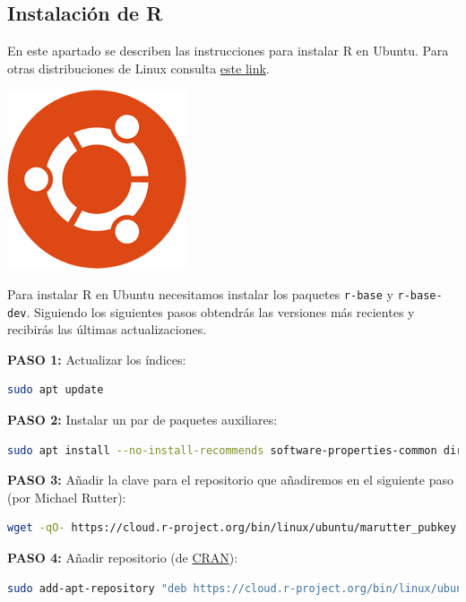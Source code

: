 \documentclass[
  title=normal,
  notoc,
  bib=normal]{mnye}
\newcommand{\passthrough}[1]{#1}
\begin{document}
\hypertarget{instalaciuxf3n-de-r}{%
\subsection{Instalación de R}\label{instalaciuxf3n-de-r}}

En este apartado se describen las instrucciones para instalar R en Ubuntu. Para otras distribuciones de Linux consulta \href{https://cloud.r-project.org/bin/linux/}{este link}.

\begin{center}\includegraphics[width=0.15\linewidth]{images/os/ubuntu} \end{center}

Para instalar R en Ubuntu necesitamos instalar los paquetes \passthrough{\lstinline!r-base!} y \passthrough{\lstinline!r-base-dev!}. Siguiendo los siguientes pasos obtendrás las versiones más recientes y recibirás las últimas actualizaciones.

\textbf{PASO 1: } Actualizar los índices:

\begin{lstlisting}[language=bash]
sudo apt update 
\end{lstlisting}

\textbf{PASO 2: } Instalar un par de paquetes auxiliares:

\begin{lstlisting}[language=bash]
sudo apt install --no-install-recommends software-properties-common dirmngr 
\end{lstlisting}

\textbf{PASO 3: } Añadir la clave para el repositorio que añadiremos en el siguiente paso (por Michael Rutter):

\begin{lstlisting}[language=bash]
wget -qO- https://cloud.r-project.org/bin/linux/ubuntu/marutter_pubkey.asc | sudo tee -a /etc/apt/trusted.gpg.d/cran_ubuntu_key.asc
\end{lstlisting}

\textbf{PASO 4: } Añadir repositorio (de \href{https://cran.r-project.org/}{CRAN}):

\begin{lstlisting}[language=bash]
sudo add-apt-repository "deb https://cloud.r-project.org/bin/linux/ubuntu $(lsb_release -cs)-cran40/"
\end{lstlisting}
\end{document}
